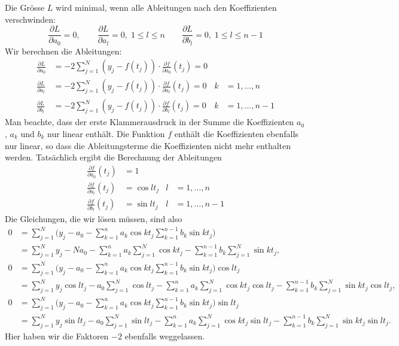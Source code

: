 Die Grösse $L$ wird minimal, wenn alle Ableitungen nach den Koeffizienten
verschwinden:
\[
\frac{\partial L}{\partial a_0}=0,
\qquad
\frac{\partial L}{\partial a_l}=0, \;{1\le l\le n}
\qquad
\frac{\partial L}{\partial b_l}=0, \;{1\le l\le n-1}
\]
Wir berechnen die Ableitungen:
\begin{align*}
\frac{\partial L}{\partial a_0}
&=
-2 \sum_{j=1}^N (y_j-f(t_j))\cdot \frac{\partial f}{\partial a_0}(t_j)=0
&&
\\
\frac{\partial L}{\partial a_l}
&=
-2 \sum_{j=1}^N (y_j-f(t_j))\cdot \frac{\partial f}{\partial a_l}(t_j)=0
&k&=1,\dots,n
\\
\frac{\partial L}{\partial b_l}
&=
-2 \sum_{j=1}^N (y_j-f(t_j))\cdot \frac{\partial f}{\partial b_l}(t_j)=0
&k&=1,\dots,n-1
\end{align*}
Man beachte, dass der erste Klammerausdruck in der Summe die Koeffizienten
$a_0$, $a_k$ und $b_k$ nur linear enthält.
Die Funktion $f$ enthält die Koeffizienten ebenfalls nur linear, so
dass die Ableitungsterme die Koeffizienten nicht mehr enthalten werden.
Tatsächlich ergibt die Berechnung der Ableitungen
\begin{align*}
\frac{\partial f}{\partial a_0}(t_j)
&=
1
&&
\\
\frac{\partial f}{\partial a_l}(t_j)
&=
\cos lt_j
&l&=1,\dots,n
\\
\frac{\partial f}{\partial b_l}(t_j)
&=
\sin lt_j
&l&=1,\dots,n-1
\end{align*}
Die Gleichungen, die wir lösen müssen, sind also
\begin{equation}
\begin{aligned}
0&=
\sum_{j=1}^N
\biggl(
y_j - a_0 - \sum_{k=1}^n a_k\cos kt_j \sum_{k=1}^{n-1} b_k\sin kt_j
\biggl)
\\
&=
\sum_{j=1}^N y_j
-Na_0
-\sum_{k=1}^n a_k \sum_{j=1}^N\cos kt_j
-\sum_{k=1}^{n-1} b_k \sum_{j=1}^N\sin kt_j,
\\
0&=
\sum_{j=1}^N
\biggl(
y_j - a_0 - \sum_{k=1}^n a_k\cos kt_j \sum_{k=1}^{n-1} b_k\sin kt_j
\biggl) \cos lt_j
\\
&=
\sum_{j=1}^N y_j \cos lt_j
-a_0\sum_{j=1}^N \cos lt_j
-\sum_{k=1}^n a_k \sum_{j=1}^N\cos kt_j\cos lt_j
-\sum_{k=1}^{n-1} b_k \sum_{j=1}^N\sin kt_j\cos lt_j,
\\
0
&=
\sum_{j=1}^N
\biggl(
y_j - a_0 - \sum_{k=1}^n a_k\cos kt_j \sum_{k=1}^{n-1} b_k\sin kt_j
\biggl) \sin lt_j
\\
&=
\sum_{j=1}^N y_j \sin lt_j
-a_0\sum_{j=1}^N \sin lt_j
-\sum_{k=1}^n a_k \sum_{j=1}^N\cos kt_j\sin lt_j
-\sum_{k=1}^{n-1} b_k \sum_{j=1}^N\sin kt_j\sin lt_j.
\end{aligned}
\label{skript:fourier:gl2}
\end{equation}
Hier haben wir die Faktoren $-2$ ebenfalls weggelassen.

